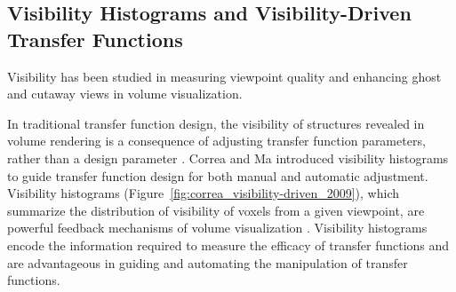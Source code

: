 \documentclass{egpubl}
\begin{document}
\subsection{Visibility Histograms and Visibility-Driven Transfer Functions}
Visibility has been studied in measuring viewpoint quality \cite{bordoloi_view_2005} and enhancing ghost and cutaway views \cite{viola_importance-driven_2004} in volume visualization.

In traditional transfer function design, the visibility of structures revealed in volume rendering is a consequence of adjusting transfer function parameters, rather than a design parameter \cite{preim_visual_2013}.
Correa and Ma \cite{correa_visibility-driven_2009} introduced visibility histograms to guide transfer function design for both manual and automatic adjustment.
Visibility histograms (Figure~\ref{fig:correa_visibility-driven_2009}), which summarize the distribution of visibility of voxels from a given viewpoint, are powerful feedback mechanisms of volume visualization \cite{emsenhuber_visibility_2008}.
Visibility histograms encode the information required to measure the efficacy of transfer functions and are advantageous in guiding and automating the manipulation of transfer functions.
\end{document}
